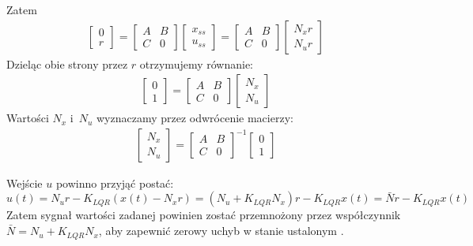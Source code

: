 \documentclass{article}
\begin{document}
    Zatem
    \begin{align*}
        \begin{bmatrix} 0 \\ r \end{bmatrix} = \begin{bmatrix} A & B \\ C & 0 \end{bmatrix} \begin{bmatrix} x_{ss} \\ u_{ss} \end{bmatrix} = 
        \begin{bmatrix}  A & B \\ C & 0 \end{bmatrix} \begin{bmatrix} N_x r \\ N_u r \end{bmatrix}         
    \end{align*}
    Dzieląc obie strony przez $r$ otrzymujemy równanie:
    \begin{align*}
        \begin{bmatrix} 0 \\ 1 \end{bmatrix} = \begin{bmatrix} A & B \\ C & 0 \end{bmatrix} \begin{bmatrix} N_x \\ N_u \end{bmatrix}         
    \end{align*}
    Wartości $N_x$ i~$N_u$ wyznaczamy przez odwrócenie macierzy:
    \begin{align*}
        \begin{bmatrix} N_x \\ N_u \end{bmatrix} = \begin{bmatrix} A & B \\ C & 0 \end{bmatrix}^{-1} \begin{bmatrix} 0 \\ 1 \end{bmatrix}   
    \end{align*}   

    Wejście $u$ powinno przyjąć postać:
    \begin{equation}
        u(t) = N_u r - K_{LQR}(x(t)-N_x r) = (N_u + K_{LQR}N_x)r - K_{LQR}x(t) = \bar{N}r - K_{LQR}x(t)
    \end{equation}
    Zatem sygnał wartości zadanej powinien zostać przemnożony przez współczynnik $\bar{N} = N_u + K_{LQR}N_x$, aby zapewnić zerowy uchyb w stanie ustalonym \cite{Franklin2006}.
    
\end{document}

